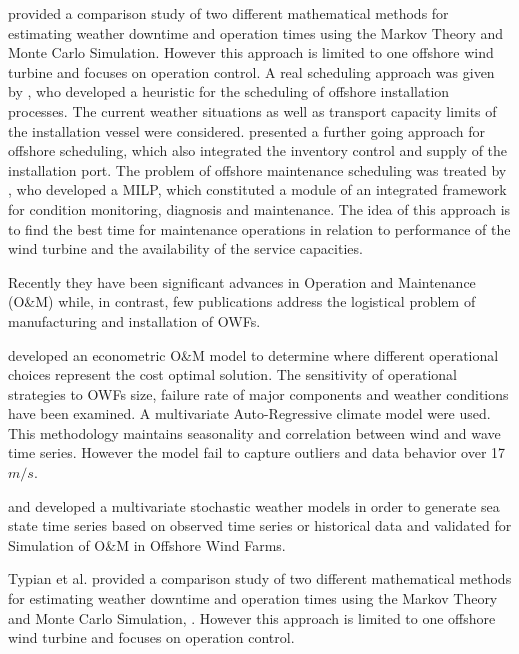 \cite{Tyapin2011} provided a comparison study of two different mathematical methods for estimating weather downtime and operation times using the Markov Theory and Monte Carlo Simulation. However this approach is limited to one offshore wind turbine and focuses on operation control. A real scheduling approach was given by \cite{Scholz2010}, who developed a heuristic for the scheduling of offshore installation processes. The current weather situations as well as transport capacity limits of the installation vessel were considered. \cite{ISOPE2012} presented a further going approach for offshore scheduling, which also integrated the inventory control and supply of the installation port.
The problem of offshore maintenance scheduling was treated by \cite{Kovacs2011497}, who developed a MILP, which constituted a module of an integrated framework for condition monitoring, diagnosis and maintenance. The idea of this approach is to find the best time for maintenance operations in relation to performance of the wind turbine and the availability of the service capacities.



Recently they have been significant advances in Operation and Maintenance (O\&M) while, in contrast, few publications address the logistical problem of manufacturing and installation of OWFs.

\cite{dinwoodie2013} developed an econometric O\&M model to determine where different operational choices represent the cost optimal solution. The sensitivity of operational strategies to OWFs size, failure rate of major components and weather conditions have been examined. A multivariate Auto-Regressive climate model were used. This methodology maintains seasonality and correlation between wind and wave time series. However the model fail to capture outliers and data behavior over 17 $m/s$.


\cite{Hagen2013} and \cite{scheu2012} developed  a multivariate stochastic weather models in order to generate sea state time series based on observed time series or historical data and validated for Simulation of O\&M in Offshore Wind Farms. 


Typian et al. provided a comparison study of two different mathematical methods for estimating weather downtime and operation times using the Markov Theory and Monte Carlo Simulation, \cite{Tyapin2011}. However this approach is limited to one offshore wind turbine and focuses on operation control.




